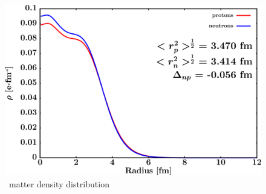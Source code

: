 \begin{figure}[hbtp]
    \centering
    \begin{minipage}{0.70\textwidth}
        \centering
        \includegraphics[width=\linewidth]{figures/ca40_matterDensity.png}
        \caption*{\caForty\ matter density distribution}
        \label{DOMFitData_ca40_matterDensity}
    \end{minipage}
\end{figure}

